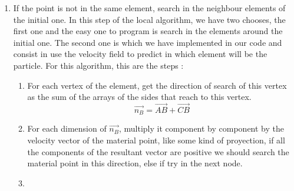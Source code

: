 \begin{enumerate}
  \item If the point is not in the same element, search in the
    neighbour elements of the initial one. In this step of the local
    algorithm, we have two chooses, the first one and the easy one to
    program is search in the elements around the initial one. The
    second one is which we have implemented in our code and consist in
    use the velocity field to predict in which element will be the
    particle. For this algorithm, this are the steps :
    \begin{enumerate}
    \item For each vertex of the element, get the direction of search
      of this vertex as the sum of the arrays of the sides that reach
      to this vertex.
      \begin{equation}
        \label{eq:VertexSeachDirection}
        \overrightarrow{n_B} = \overrightarrow{AB} + \overrightarrow{CB}
      \end{equation}
    \item For each dimension of $\overrightarrow{n_B}$, multiply it
      component by component by the velocity vector of the material
      point, like some kind of proyection, if all the components of
      the resultant vector are positive we should search the material
      point in this direction, else if try in the next node.

    \item 
    \end{enumerate}

  
  
\end{enumerate}




